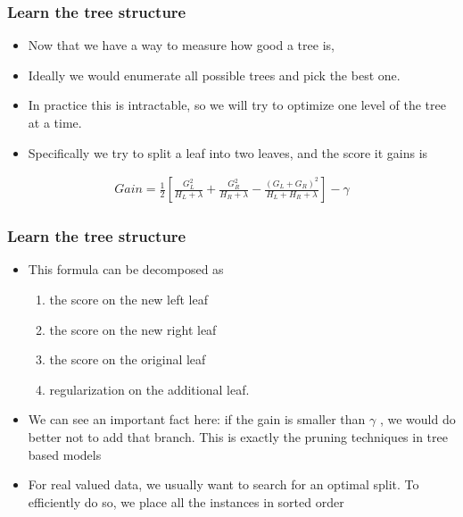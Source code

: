 \documentclass[
  shownotes,
  xcolor={svgnames},
  hyperref={colorlinks,citecolor=DarkBlue,linkcolor=DarkRed,urlcolor=DarkBlue}
  , aspectratio=169]{beamer}
\begin{document}
\begin{frame}[fragile]
\frametitle{Learn the tree structure}

\begin{itemize}
\item Now that we have a way to measure how good a tree is, 
\medskip
\item Ideally we would enumerate all possible trees and pick the best one. 
\medskip
\item In practice this is intractable, so we will try to optimize one level of the tree at a time. 
\medskip
\item Specifically we try to split a leaf into two leaves, and the score it gains is
\end{itemize}
\begin{align}
Gain = \frac{1}{2} \left[\frac{G_L^2}{H_L+\lambda}+\frac{G_R^2}{H_R+\lambda}-\frac{(G_L+G_R)^2}{H_L+H_R+\lambda}\right] - \gamma
\end{align}

 \end{frame}
\begin{frame}[fragile]
\frametitle{Learn the tree structure}

\begin{itemize}
  \item This formula can be decomposed as 
  \medskip
\begin{enumerate}
\item  the score on the new left leaf 
\medskip
\item the score on the new right leaf 
\medskip
\item the score on the original leaf 
\medskip
\item  regularization on the additional leaf. 
\end{enumerate}
\item We can see an important fact here: if the gain is smaller than $\gamma$ , we would do better not to add that branch. This is exactly the pruning techniques in tree based models

\item For real valued data, we usually want to search for an optimal split. To efficiently do so, we place all the instances in sorted order


\end{itemize}


 \end{frame}
\end{document}
